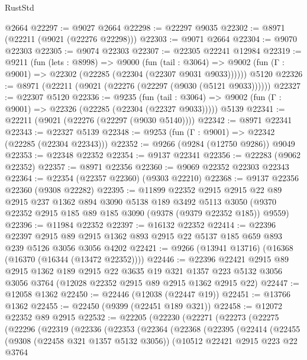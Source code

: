 \begin{lexlean}{RustStd}
\begin{coremodule}
    @2664
@22297 := @9027 @2664
@22298 := @22297 @9035
@22302 := @8971 (@22211 (@9021 (@22276 @22298)))
@22303 := @9071 @2664
@22304 := @9070 @22303
@22305 := @9074 @22303
@22307 := @22305 @22241 @12984
@22319 := @9211
    (fun (lets : @8998) =>
    @9000
      (fun (tail : @3064) =>
      @9002 (fun (Γ : @9001) => @22302 (@22285 (@22304 (@22307 @9031 @9033))))))
    @5120
@22326 := @8971 (@22211 (@9021 (@22276 (@22297 (@9030 (@5121 @9033))))))
@22327 := @22307 @5120
@22336 := @9235
    (fun (tail : @3064) => @9002 (fun (Γ : @9001) => @22326 (@22285 (@22304 (@22327 @9033)))))
    @5139
@22341 := @22211 (@9021 (@22276 (@22297 (@9030 @5140))))
@22342 := @8971 @22341
@22343 := @22327 @5139
@22348 := @9253 (fun (Γ : @9001) => @22342 (@22285 (@22304 @22343)))
@22352 := @9266 (@9284 (@12750 @9286)) @9049
@22353 := @22348 @22352
@22354 := @9137 @22341
@22356 := @22283 (@9062 @22352)
@22357 := @8971 @22356
@22360 := @9069 @22352 @22303 @22343
@22364 := @22354 (@22357 @22360) (@9303 @22210)
@22368 := @9137 @22356 @22360 (@9308 @22282)
@22395 := @11899
    @22352
    @2915
    @2915
    @22
    @89
    @2915
    @237
    @1362
    @894
    @3090
    @5138
    @189
    @3492
    @5113
    @3050
    (@9370 @22352 @2915 @185 @89 @185 @3090 (@9378 (@9379 @22352 @185)) @9559)
@22396 := @11984 @22352
@22397 := @16132 @22352
@22414 := @22396
    @22397
    @2915
    @89
    @2915
    @1362
    @893
    @2915
    @22
    @5137
    @185
    @659
    @893
    @239
    @5126
    @3056
    @3056
    @4202
@22421 := @9266 (@13941 @13716) (@16368 (@16370 (@16344 (@13472 @22352))))
@22446 := @22396
    @22421
    @2915
    @89
    @2915
    @1362
    @189
    @2915
    @22
    @3635
    @19
    @321
    @1357
    @223
    @5132
    @3056
    @3056
    @3764
    (@12028 @22352 @2915 @89 @2915 @1362 @2915 @22)
@22447 := @12058 @1362
@22450 := @22446 (@12038 (@22447 @19))
@22451 := @13766 @1362
@22455 := @22450 (@9399 (@22451 @189 @321))
@22458 := @12072 @22352 @89 @2915
@22532 := @22205
    (@22230
      (@22271
        (@22273
          (@22275
            (@22296
              (@22319
                (@22336
                  (@22353
                    (@22364
                      (@22368
                        (@22395
                          (@22414
                            (@22455
                              (@9308 (@22458 @321 @1357 @5132 @3056))
                              (@10512
                                @22421
                                @2915
                                @223
                                @22
                                @3764

\end{coremodule}
\end{lexlean}
